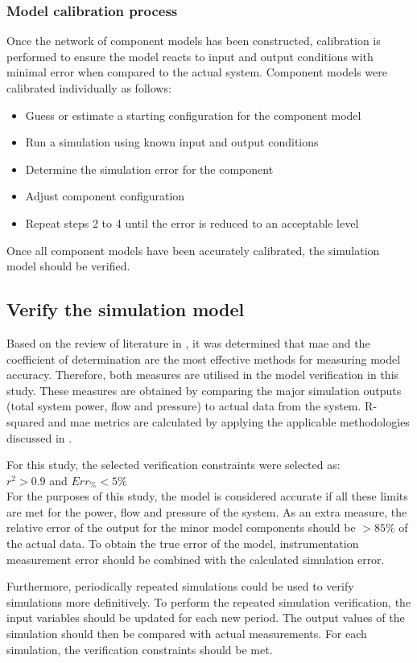 	\subsubsection{Model calibration process}
	Once the network of component models has been constructed, calibration is performed to ensure the model reacts to input and output conditions with minimal error when compared to the actual system. Component models were calibrated individually as follows:
	\begin{itemize}
		\item Guess or estimate a starting configuration for the component model
		\item Run a simulation using known input and output conditions
		\item Determine the simulation error for the component
		\item Adjust component configuration 
		\item Repeat steps 2 to 4 until the error is reduced to an acceptable level
	\end{itemize} 
	Once all component models have been accurately calibrated, the simulation model should be verified.
	\subsection{Verify the simulation model}
	Based on the review of literature in , it was determined that \gls{mae} and the coefficient of determination are the most effective methods for measuring model accuracy. Therefore, both measures are utilised in the model verification in this study. These measures are obtained by comparing the major simulation outputs (total system power, flow and pressure) to actual data from the system. R-squared and \gls{mae} metrics are calculated by applying the applicable methodologies discussed in .	
	\par 
	For this study, the selected verification constraints were selected as: \\ {$r^2 > 0.9 $ and $ Err_{\%} < 5\% $}\\ 
	For the purposes of this study, the model is considered accurate if all these limits are met for the power, flow and pressure of the system. As an extra measure, the relative error of the output for the minor model components should be $ > 85\%$ of the actual data. To obtain the true error of the model, instrumentation measurement error should be combined with the calculated simulation error.
	\par 
	Furthermore, periodically repeated simulations could be used to verify simulations more definitively. To perform the repeated simulation verification, the input variables should be updated for each new period. The output values of the simulation should then be compared with actual measurements. For each simulation, the verification constraints should be met.
		
